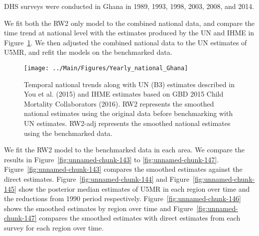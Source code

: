 \documentclass[12pt]{article}\usepackage[]{graphicx}\usepackage[]{color}
\newenvironment{knitrout}{}{} %
\begin{document}


DHS surveys were conducted in Ghana in 1989, 1993, 1998, 2003, 2008, and 2014.

We fit both the RW2 only model to the combined national data, and compare the time trend at national level with the estimates produced by the UN and IHME in Figure~\ref{fig:unnamed-chunk-142}. We then adjusted the combined national data to the UN estimates of U5MR, and refit the models on the benchmarked data. 

\begin{knitrout}
\color{fgcolor}\begin{figure}[bht]

{\centering \texttt{[image: ../Main/Figures/Yearly\_national\_Ghana]} 

}

\caption[Temporal national trends along with UN (B3) estimates described in You et al]{Temporal national trends along with UN (B3) estimates described in You et al. (2015) and IHME estimates based on GBD 2015 Child Mortality Collaborators (2016). RW2 represents the smoothed national estimates using the original data before benchmarking with UN estimates. RW2-adj represents the smoothed national estimates using the benchmarked data.}\label{fig:unnamed-chunk-142}
\end{figure}


\end{knitrout}
 

We fit the RW2 model to the benchmarked data in each area. 
We compare the results in Figure~\ref{fig:unnamed-chunk-143} to \ref{fig:unnamed-chunk-147}.
Figure~\ref{fig:unnamed-chunk-143} compares the smoothed estimates against the direct estimates. Figure~\ref{fig:unnamed-chunk-144} and Figure~\ref{fig:unnamed-chunk-145} show the posterior median estimates of U5MR in each region over time and the reductions from 1990 period respectively.
Figure~\ref{fig:unnamed-chunk-146} shows the smoothed estimates by region over time and Figure~\ref{fig:unnamed-chunk-147} compares the smoothed estimates with direct estimates from each survey for each region over time.


\end{document}
